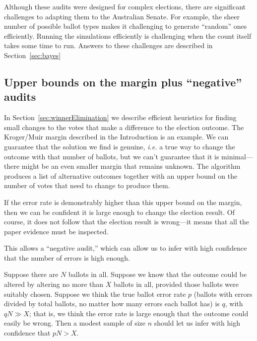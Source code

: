 \documentclass[10pt,a4paper]{article}
\begin{document}
Although these audits were designed for complex elections, there are significant challenges to adapting them to the Australian Senate.  For example, the sheer number of possible ballot types makes it challenging to generate ``random'' ones efficiently.  Running the simulations efficiently is challenging when the count itself takes some time to run.  Answers to these challenges are described in Section~\ref{sec:bayes}



\subsection{Upper bounds on the margin plus ``negative'' audits}
In Section~\ref{sec:winnerElimination} we describe efficient heuristics for finding small changes to the votes that make a difference to the election outcome.  The Kroger/Muir margin described in the Introduction is an example.     
We can guarantee that the solution we find is genuine, {\it i.e.} a true way to change the outcome with that number of ballots, but we can't guarantee that it is minimal---there might be an even smaller margin that remains unknown.  The algorithm produces a list of alternative outcomes together with an upper bound on the number of votes that need to change to produce them.

If the error rate is demonstrably higher than this upper bound on the margin, then we can be confident it is large enough to change the election result. Of course, it does not follow that the election result is wrong---it means that all the paper evidence must be inspected.  

This allows a ``negative audit,'' which can allow us to infer with high confidence that the number of errors is high enough.   

Suppose there are $N$ ballots in all.
Suppose we know that the outcome could be altered by altering no more than $X$ ballots in all, provided those ballots were suitably chosen.  Suppose
we think the true ballot error rate $p$ (ballots with errors divided by total ballots, no matter how many errors each ballot has) is $q$, with $qN \gg X$; that is, we think the error rate is large enough that the outcome could easily be wrong.  Then a modest sample
of size $n$ should let us infer with high confidence that $pN > X$. 
\end{document}

